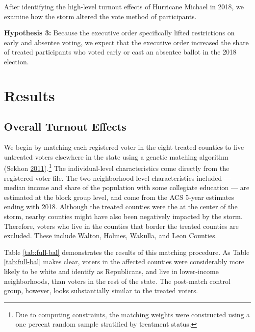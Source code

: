 \documentclass[
  12pt,
]{article}
\begin{document}
After identifying the high-level turnout effects of Hurricane Michael in 2018, we examine how the storm altered the vote method of participants.

\textbf{Hypothesis 3:} Because the executive order specifically lifted restrictions on early and absentee voting, we expect that the executive order increased the share of treated participants who voted early or cast an absentee ballot in the 2018 election.

\hypertarget{results}{%
\section*{Results}\label{results}}

\hypertarget{overall-turnout-effects}{%
\subsection*{Overall Turnout Effects}\label{overall-turnout-effects}}

We begin by matching each registered voter in the eight treated counties to five untreated voters elsewhere in the state using a genetic matching algorithm (Sekhon \protect\hyperlink{ref-Sekhon2011}{2011}).\footnote{Due to computing constraints, the matching weights were constructed using a one percent random sample stratified by treatment status.} The individual-level characteristics come directly from the registered voter file. The two neighborhood-level characteristics included --- median income and share of the population with some collegiate education --- are estimated at the block group level, and come from the ACS 5-year estimates ending with 2018. Although the treated counties were the at the center of the storm, nearby counties might have also been negatively impacted by the storm. Therefore, voters who live in the counties that border the treated counties are excluded. These include Walton, Holmes, Wakulla, and Leon Counties.

Table \ref{tab:full-bal} demonstrates the results of this matching procedure. As Table \ref{tab:full-bal} makes clear, voters in the affected counties were considerably more likely to be white and identify as Republicans, and live in lower-income neighborhoods, than voters in the rest of the state. The post-match control group, however, looks substantially similar to the treated voters.
\end{document}

